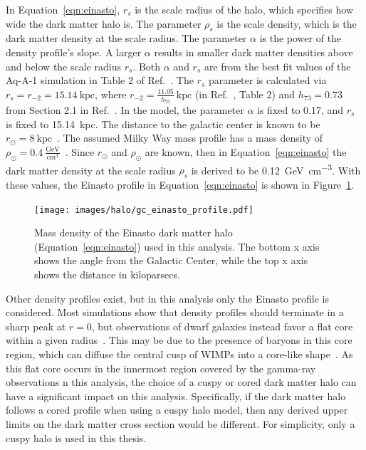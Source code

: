    
    In Equation~\ref{eqn:einasto}, $r_s$ is the scale radius of the halo, which specifies how wide the dark matter halo is.
    The parameter $\rho_s$ is the scale density, which is the dark matter density at the scale radius.
    The parameter $\alpha$ is the power of the density profile's slope.
    A larger $\alpha$ results in smaller dark matter densities above and below the scale radius $r_s$.
    Both $\alpha$ and $r_s$ are from the best fit values of the Aq-A-1 simulation in Table 2 of Ref.~\cite{mw_halo_params}.
    The $r_s$ parameter is calculated via $r_s=r_{-2}=15.14\:\textrm{kpc}$, where $r_{-2}=\frac{11.05}{h_{73}}\:\textrm{kpc}$ (in Ref.~\cite{mw_halo_params}, Table 2) and $h_{73}=0.73$ from Section 2.1 in Ref.~\cite{mw_halo_params}.
    In the model, the parameter $\alpha$ is fixed to 0.17, and $r_s$ is fixed to \SI{15.14}{kpc}.
    The distance to the galactic center is known to be $r_\odot=8\:\textrm{kpc}$~\cite{gc_distance_1,gc_distance_2,gc_distance_3}.
    The assumed Milky Way mass profile has a mass density of $\rho_\odot = 0.4\:\frac{\textrm{GeV}}{\textrm{cm}^3}$~\cite{local_dm_density,direct_dm_astrophysical_uncertainties}.
    Since $r_\odot$ and $\rho_\odot$ are known, then in Equation~\ref{eqn:einasto} the dark matter density at the scale radius $\rho_s$ is derived to be \SI{0.12}{\GeV\per\cm^3}.
    With these values, the Einasto profile in Equation~\ref{eqn:einasto} is shown in Figure~\ref{fig:gchalo_density}.
  
    \begin{figure}[ht]
      \centering
      \texttt{[image: images/halo/gc\_einasto\_profile.pdf]}
      \caption[Galactic Center Einasto Halo Density]{
        Mass density of the Einasto dark matter halo (Equation~\ref{eqn:einasto}) used in this analysis.
        The bottom x axis shows the angle from the Galactic Center, while the top x axis shows the distance in kiloparsecs.
        \CaptionBlankLine
        }
      \label{fig:gchalo_density}
    \end{figure}

    Other density profiles exist, but in this analysis only the Einasto profile is considered.
    Most simulations show that density profiles should terminate in a sharp peak at $r=0$, but observations of dwarf galaxies instead favor a flat core within a given radius~\cite{flores1994observational,CoreVsCusp}.
    This may be due to the presence of baryons in this core region, which can diffuse the central cusp of WIMPs into a core-like shape~\cite{corecusp_baryondiffuse1,corecusp_baryondiffuse2}.
    As this flat core occurs in the innermost region covered by the gamma-ray observations n this analysis, the choice of a cuspy or cored dark matter halo can have a significant impact on this analysis.
    Specifically, if the dark matter halo follows a cored profile when using a cuspy halo model, then any derived upper limits on the dark matter cross section would be different.
    For simplicity, only a cuspy halo is used in this thesis.
    
